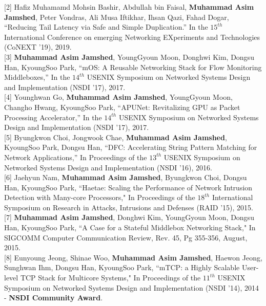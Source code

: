 \documentclass[10pt]{article}
\begin{document}
[2] Hafiz Muhamamd Mohsin Bashir, Abdullah bin Faisal, {\bf Muhammad Asim Jamshed},
Peter Vondras, Ali Musa Iftikhar, Ihsan Qazi, Fahad Dogar,
{``Reducing Tail Latency via Safe and Simple Duplication.''}
In the $15^{th}$ International Conference on emerging Networking EXperiments and
Technologies (CoNEXT '19), 2019.\\

[3] {\bf Muhammad Asim Jamshed}, YoungGyoun Moon, Donghwi Kim, Dongsu Han,
KyoungSoo Park,
{``mOS: A Reusable Networking Stack for Flow Monitoring Middleboxes,'' }
   In the $14^{th}$ USENIX Symposium on Networked Systems Design
   and Implementation (NSDI '17), 2017.\\

[4] Younghwan Go, {\bf Muhammad Asim Jamshed}, YoungGyoun Moon, Changho
Hwang, KyoungSoo Park,
{``APUNet: Revitalizing GPU as Packet Processing Accelerator,'' }
   In the $14^{th}$ USENIX Symposium on Networked Systems Design
   and Implementation (NSDI '17), 2017.\\

[5] Byungkwon Choi, Jongwook Chae, {\bf Muhammad Asim Jamshed}, KyoungSoo
Park, Dongsu Han,
{``DFC: Accelerating String Pattern Matching for Network Applications,'' }
   In Proceedings of the $13^{th}$ USENIX Symposium on Networked Systems
   Design and Implementation (NSDI '16), 2016.\\

[6] Jaehyun Nam, {\bf Muhammad Asim Jamshed}, Byungkwon Choi, Dongsu Han,
KyoungSoo Park,
{ ``Haetae: Scaling the Performance of Network Intrusion Detection with Many-core Processors," }
    In Proceedings of the $18^{th}$ International Symposium on Research in
    Attacks, Intrusions and Defenses (RAID '15), 2015.\\

[7] {\bf Muhammad Asim Jamshed}, Donghwi Kim, YoungGyoun Moon, Dongsu Han,
KyoungSoo Park,
{ ``A Case for a Stateful Middlebox Networking Stack," }
    In SIGCOMM Computer Communication Review, Rev. 45, Pg 355-356, August, 2015.\\


[8] Eunyoung Jeong, Shinae Woo, {\bf Muhammad Asim Jamshed}, Haewon Jeong,
Sunghwan Ihm, Dongsu Han, KyoungSoo Park,
{ ``mTCP: a Highly Scalable User-level TCP Stack for Multicore Systems," }
    In Proceedings of the $11^{th}$ USENIX Symposium on Networked Systems
    Design and Implementation (NSDI '14), 2014 - {\bf NSDI Community Award}.\\
\end{document}
